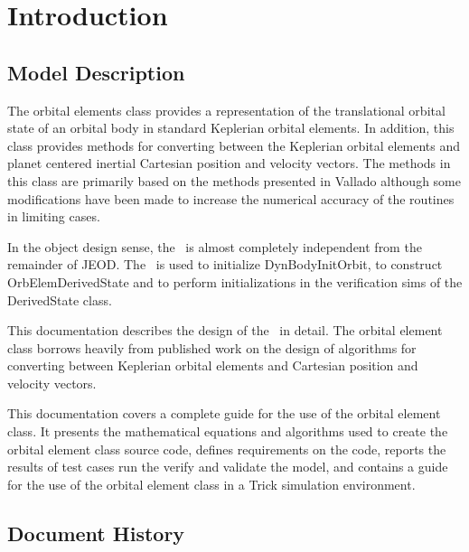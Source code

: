 \setcounter{chapter}{0}

\chapter{Introduction}\label{ch:intro}


\section{Model Description}

The orbital elements class provides a representation of the translational
orbital state of an orbital body in standard Keplerian orbital elements.  In
addition, this class provides methods for converting between the Keplerian
orbital elements and planet centered inertial Cartesian position and velocity
vectors.  The methods in this class are primarily based on the methods
presented in Vallado \cite{Vallado} although some modifications have been made
to increase the numerical accuracy of the routines in limiting cases.

In the object design sense, the \OrbitalElement\ is almost completely independent from the remainder of JEOD.  The \OrbitalElement\ is
used to initialize DynBodyInitOrbit, to construct OrbElemDerivedState and to perform initializations in the verification sims of the DerivedState class.

This documentation describes the design of the \OrbitalElement\
in detail.  The orbital element class borrows heavily from published work
on the design of algorithms for converting between Keplerian orbital elements
and Cartesian position and velocity vectors.

This documentation covers a complete guide for the use of the orbital element
class.  It presents the mathematical equations and algorithms used to create
the orbital element class source code, defines requirements on the code,
reports the results of test cases run the verify and validate the model, and
contains a guide for the use of the orbital element class in a Trick
simulation environment.

\section{Document History}


